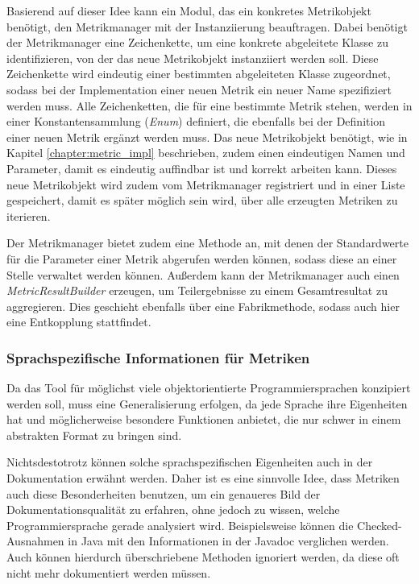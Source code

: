 Basierend auf dieser Idee kann ein Modul, das ein konkretes Metrikobjekt benötigt, den Metrikmanager mit der Instanziierung beauftragen. Dabei benötigt der Metrikmanager eine Zeichenkette, um eine konkrete abgeleitete Klasse zu identifizieren, von der das neue Metrikobjekt instanziiert werden soll. Diese Zeichenkette wird eindeutig einer bestimmten abgeleiteten Klasse zugeordnet, sodass bei der Implementation einer neuen Metrik ein neuer Name spezifiziert werden muss. Alle Zeichenketten, die für eine bestimmte Metrik stehen, werden in einer Konstantensammlung  (\textit{Enum}) definiert, die ebenfalls bei der Definition einer neuen Metrik ergänzt werden muss.  Das neue Metrikobjekt benötigt, wie in Kapitel \ref{chapter:metric_impl} beschrieben, zudem einen eindeutigen Namen und Parameter, damit es eindeutig auffindbar ist und korrekt arbeiten kann. Dieses neue Metrikobjekt wird zudem vom Metrikmanager registriert und in einer Liste gespeichert, damit es später möglich sein wird, über alle erzeugten Metriken zu iterieren. 

Der Metrikmanager bietet zudem eine Methode an, mit denen der Standardwerte für die Parameter einer Metrik abgerufen werden können, sodass diese an einer Stelle verwaltet werden können. Außerdem kann der Metrikmanager auch einen \textit{MetricResultBuilder} erzeugen, um Teilergebnisse zu einem Gesamtresultat zu aggregieren. Dies geschieht ebenfalls über eine Fabrikmethode, sodass auch hier eine Entkopplung stattfindet. 

\subsubsection{Sprachspezifische Informationen für Metriken}\label{chapter:langSpec}
Da das Tool für möglichst viele objektorientierte Programmiersprachen konzipiert werden soll, muss eine Generalisierung erfolgen, da jede Sprache ihre Eigenheiten hat und möglicherweise besondere Funktionen anbietet, die nur schwer in einem abstrakten Format zu bringen sind.

Nichtsdestotrotz können solche sprachspezifischen Eigenheiten auch in der Dokumentation erwähnt werden. Daher ist es eine sinnvolle Idee, dass Metriken auch diese Besonderheiten benutzen, um ein genaueres Bild der Dokumentationsqualität zu erfahren, ohne jedoch zu wissen, welche Programmiersprache gerade analysiert wird. Beispielsweise können die Checked-Ausnahmen in Java mit den Informationen in der Javadoc verglichen werden. Auch können hierdurch überschriebene Methoden ignoriert werden, da diese oft nicht mehr dokumentiert werden müssen.

